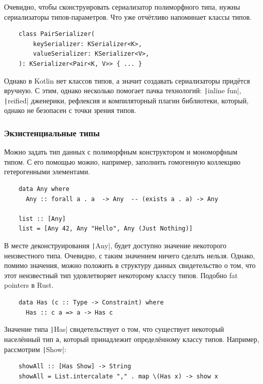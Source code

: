 Очевидно, чтобы сконструировать сериализатор полиморфного типа, нужны сериализаторы типов-параметров.
Что уже отчётливо напоминает классы типов.
\begin{verbatim}
    class PairSerializer(
        keySerializer: KSerializer<K>,
        valueSerializer: KSerializer<V>,
    ): KSerializer<Pair<K, V>> { ... }
\end{verbatim}

Однако в Kotlin нет классов типов, а значит создавать сериализаторы придётся вручную.
С этим, однако несколько помогает пачка технологий: \texttt|inline fun|, \texttt|reified| дженерики, рефлексия и компиляторный плагин библиотеки, который, однако не безопасен с точки зрения типов.

\subsubsection{Экзистенциальные типы} \label{subsubsec:existentials}

Можно задать тип данных с полиморфным конструктором и мономорфным типом.
С его помощью можно, например, заполнить гомогенную коллекцию гетерогенными элементами.
\begin{verbatim}
    data Any where
      Any :: forall a . a  -> Any  -- (exists a . a) -> Any

    list :: [Any]
    list = [Any 42, Any "Hello", Any (Just Nothing)]
\end{verbatim}

В месте деконструирования \texttt|Any|, будет доступно значение некоторого неизвестного типа.
Очевидно, с таким значением ничего сделать нельзя.
Однако, помимо значения, можно положить в структуру данных свидетельство о том, что этот неизвестный тип удовлетворяет некоторому классу типов.
Подобно fat pointers в Rust.
\begin{verbatim}
    data Has (c :: Type -> Constraint) where
      Has :: c a => a -> Has c
\end{verbatim}

Значение типа \texttt|Has| свидетельствует о том, что существует некоторый населённый тип \texttt{a}, который принадлежит определённому классу типов.
Например, рассмотрим \texttt|Show|:
\begin{verbatim}
    showAll :: [Has Show] -> String
    showAll = List.intercalate "," . map \(Has x) -> show x
\end{verbatim}

